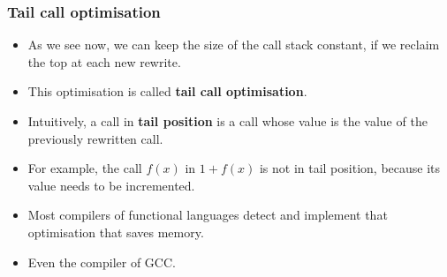 \documentclass[compress,dvips,xcolor={dvipsnames},t]{beamer}
\begin{document}
\begin{frame}
  \frametitle{Tail call optimisation}

  \begin{itemize}

    \item As we see now, we can keep the size of the call stack
      constant, if we reclaim the top at each new rewrite.

    \item This optimisation is called \textbf{tail call optimisation}.

    \item Intuitively, a call in \textbf{tail position} is a call
      whose value is the value of the previously rewritten call.

    \item For example, the call \(f(x)\) in \(1 + f(x)\) is not in
      tail position, because its value needs to be incremented.

    \item Most compilers of functional languages detect and implement
      that optimisation that saves memory.

    \item Even the \Clang compiler of \textsf{GCC}.

  \end{itemize}

\end{frame}
\end{document}
